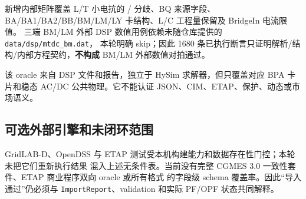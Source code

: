 新增内部矩阵覆盖 L/T 小电抗的 / 分歧、BQ
来源字段、BA/BA1/BA2/BB/BM/LM/LY 卡结构、L/C 工程量保留及 BridgeIn 电流限值。
三端 BM/LM 外部 DSP 数值用例依赖未随仓库提供的 \texttt{data/dsp/mtdc\_bm.dat}，
本轮明确 skip；因此 1680 条已执行断言只证明解析/结构/内部方程契约，\textbf{不构成}
BM/LM 外部数值对拍通过。

该 oracle 来自 DSP 文件和报告，独立于 HySim 求解器，但只覆盖对应 BPA 卡片和稳态 AC/DC
公共物理。它不能认证 JSON、CIM、ETAP、保护、动态或市场语义。

\subsection{可选外部引擎和未闭环范围}
GridLAB-D、OpenDSS 与 ETAP 测试受本机构建能力和数据存在性门控；本轮未把它们重新执行结果
混入上述无条件表。当前没有完整 CGMES 3.0 一致性套件、ETAP 商业程序双向 oracle 或所有格式
的字段级 schema 覆盖率。因此“导入通过”仍必须与 \texttt{ImportReport}、validation 和实际
PF/OPF 状态共同解释。

